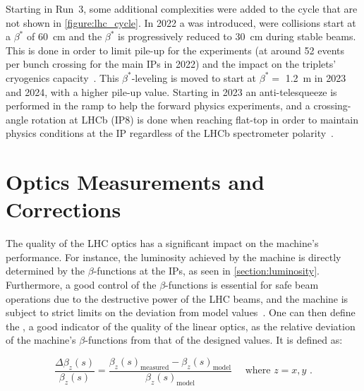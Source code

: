 Starting in Run~\num{3}, some additional complexities were added to the cycle that are not shown in \cref{figure:lhc_cycle}.
In \num{2022} a  was introduced, were collisions start at a \(\beta^{\ast}\) of \qty{60}{\centi\meter} and the \(\beta^{\ast}\) is progressively reduced to \qty{30}{\centi\meter} during stable beams.
This is done in order to limit pile-up for the experiments (at around \num{52} events per bunch crossing for the main IPs in \num{2022}) and the impact on the triplets' cryogenics capacity~\cite{CERN:Fartoukh:LHC_Config_Run3, CERN:Ferlin:Cryogenics}.
This \(\beta^{\ast}\)-leveling is moved to start at \(\beta^{\ast} =\) \qty{1.2}{\meter} in \num{2023} and \num{2024}, with a higher pile-up value.
Starting in \num{2023} an anti-telesqueeze is performed in the ramp to help the forward physics experiments, and a crossing-angle rotation at LHCb (IP\num{8}) is done when reaching flat-top in order to maintain physics conditions at the IP regardless of the LHCb spectrometer polarity~\cite{CERN:Fartoukh:LHC_Config_Run3}.


\section{Optics Measurements and Corrections}
\label{section:optics_measurements_and_corrections}

The quality of the LHC optics has a significant impact on the machine's performance.
For instance, the luminosity achieved by the machine is directly determined by the \(\beta\)-functions at the IPs, as seen in \cref{section:luminosity}.
Furthermore, a good control of the \(\beta\)-functions is essential for safe beam operations due to the destructive power of the LHC beams, and the machine is subject to strict limits on the deviation from model values~\cite{CERN:Bruning:Field_Quality_Spec_LHC_Main_Dipoles}.
One can then define the , a good indicator of the quality of the linear optics, as the relative deviation of the machine's \(\beta\)-functions from that of the designed values.
It is defined as:

\begin{equation}
  \frac{\Delta \beta_z(s)}{\beta_z(s)} = \frac{\beta_z(s)_{\mathrm{measured}} - \beta_z(s)_{\mathrm{model}}}{\beta_z(s)_{\mathrm{model}}} \quad \text { where } z = x, y \text{ .}
  \label{equation:beta_beating_definition}
\end{equation}

